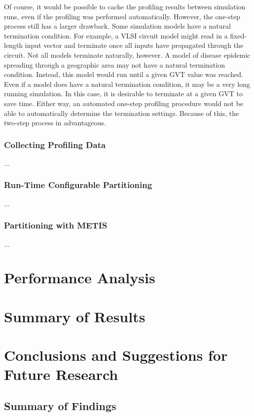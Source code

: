 \documentclass[11pt]{book}
\begin{document}
Of course, it would be possible to cache the profiling results between simulation runs, even if the profiling was performed automatically. However, the one-step process still has a larger drawback. Some simulation models have a natural termination condition. For example, a VLSI circuit model might read in a fixed-length input vector and terminate once all inputs have propagated through the circuit. Not all models terminate naturally, however. A model of disease epidemic spreading through a geographic area may not have a natural termination condition. Instead, this model would run until a given GVT value was reached. Even if a model does have a natural termination condition, it may be a very long running simulation. In this case, it is desirable to terminate at a given GVT to save time. Either way, an automated one-step profiling procedure would not be able to automatically determine the termination settings. Because of this, the two-step process in advantageous.

\subsection{Collecting Profiling Data}
...
\subsection{Run-Time Configurable Partitioning}
...
\subsection{Partitioning with METIS}
...

\chapter{Performance Analysis}\label{analysis}


\chapter{Summary of Results}\label{resultsSummary}

\chapter[Conclusions \& Future Research]{Conclusions and Suggestions for Future Research}\label{conclude}

\section{Summary of Findings}
\end{document}
